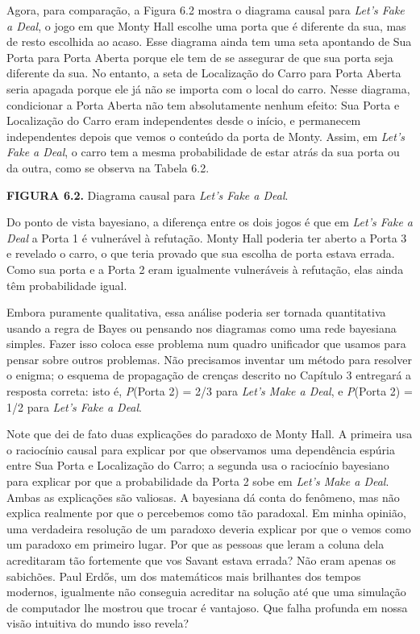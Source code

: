 \documentclass[11pt,a5paper,twoside]{book}
\begin{document}
Agora, para comparação, a Figura 6.2 mostra o diagrama causal para \textit{Let’s Fake a Deal}, o jogo em que Monty Hall escolhe uma porta que é diferente da sua, mas de resto escolhida ao acaso. Esse diagrama ainda tem uma seta apontando de Sua Porta para Porta Aberta porque ele tem de se assegurar de que sua porta seja diferente da sua. No entanto, a seta de Localização do Carro para Porta Aberta seria apagada porque ele já não se importa com o local do carro. Nesse diagrama, condicionar a Porta Aberta não tem absolutamente nenhum efeito: Sua Porta e Localização do Carro eram independentes desde o início, e permanecem independentes depois que vemos o conteúdo da porta de Monty. Assim, em \textit{Let’s Fake a Deal}, o carro tem a mesma probabilidade de estar atrás da sua porta ou da outra, como se observa na Tabela 6.2.

\textbf{FIGURA 6.2.} Diagrama causal para \textit{Let’s Fake a Deal}.

Do ponto de vista bayesiano, a diferença entre os dois jogos é que em \textit{Let’s Fake a Deal} a Porta 1 é vulnerável à refutação. Monty Hall poderia ter aberto a Porta 3 e revelado o carro, o que teria provado que sua escolha de porta estava errada. Como sua porta e a Porta 2 eram igualmente vulneráveis à refutação, elas ainda têm probabilidade igual.

Embora puramente qualitativa, essa análise poderia ser tornada quantitativa usando a regra de Bayes ou pensando nos diagramas como uma rede bayesiana simples. Fazer isso coloca esse problema num quadro unificador que usamos para pensar sobre outros problemas. Não precisamos inventar um método para resolver o enigma; o esquema de propagação de crenças descrito no Capítulo 3 entregará a resposta correta: isto é, \textit{P}(Porta 2) = 2/3 para \textit{Let’s Make a Deal}, e \textit{P}(Porta 2) = 1/2 para \textit{Let’s Fake a Deal}.

Note que dei de fato duas explicações do paradoxo de Monty Hall. A primeira usa o raciocínio causal para explicar por que observamos uma dependência espúria entre Sua Porta e Localização do Carro; a segunda usa o raciocínio bayesiano para explicar por que a probabilidade da Porta 2 sobe em \textit{Let’s Make a Deal}. Ambas as explicações são valiosas. A bayesiana dá conta do fenômeno, mas não explica realmente por que o percebemos como tão paradoxal. Em minha opinião, uma verdadeira resolução de um paradoxo deveria explicar por que o vemos como um paradoxo em primeiro lugar. Por que as pessoas que leram a coluna dela acreditaram tão fortemente que vos Savant estava errada? Não eram apenas os sabichões. Paul Erdős, um dos matemáticos mais brilhantes dos tempos modernos, igualmente não conseguia acreditar na solução até que uma simulação de computador lhe mostrou que trocar é vantajoso. Que falha profunda em nossa visão intuitiva do mundo isso revela?
\end{document}
